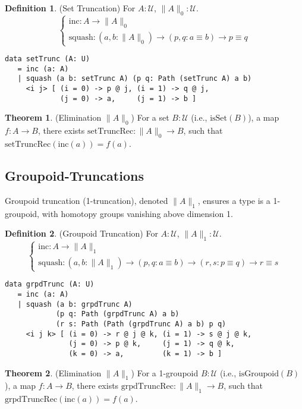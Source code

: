 \documentclass{article}
\theoremstyle{definition}
\newtheorem{theorem}{Theorem}
\newtheorem{definition}{Definition}
\begin{document}
\begin{definition} (Set Truncation)
For $A : \mathcal{U}$, $\| A \|_0 : \mathcal{U}$.
\[
\begin{cases}
\text{inc} : A \to \| A \|_0 \\
\text{squash} : (a, b : \| A \|_0) \to (p, q : a \equiv  b) \to p \equiv q
\end{cases}
\]
\begin{lstlisting}
data setTrunc (A: U)
   = inc (a: A)
   | squash (a b: setTrunc A) (p q: Path (setTrunc A) a b)
     <i j> [ (i = 0) -> p @ j, (i = 1) -> q @ j,
             (j = 0) -> a,     (j = 1) -> b ]
\end{lstlisting}
\end{definition}

\begin{theorem} (Elimination $\| A \|_0$)
For a set $B : \mathcal{U}$ (i.e., $\text{isSet}(B)$), a map $f : A \to B$,
there exists $\text{setTruncRec} : \| A \|_0 \to B$, such that $\text{setTruncRec}(\text{inc}(a)) = f(a)$.
\end{theorem}

\subsection{Groupoid-Truncations}
Groupoid truncation (1-truncation), denoted $\| A \|_1$, ensures a
type is a 1-groupoid, with homotopy groups vanishing above dimension 1.

\begin{definition} (Groupoid Truncation)
For $A : \mathcal{U}$, $\| A \|_1 : \mathcal{U}$.
\[
\begin{cases}
\text{inc} : A \to \| A \|_1 \\
\text{squash} : (a, b : \| A \|_1) \to (p, q : a \equiv b) \to (r, s : p \equiv  q) \to r \equiv s
\end{cases}
\]
\begin{lstlisting}
data grpdTrunc (A: U)
   = inc (a: A)
   | squash (a b: grpdTrunc A)
            (p q: Path (grpdTrunc A) a b)
            (r s: Path (Path (grpdTrunc A) a b) p q)
     <i j k> [ (i = 0) -> r @ j @ k, (i = 1) -> s @ j @ k,
               (j = 0) -> p @ k,     (j = 1) -> q @ k,
               (k = 0) -> a,         (k = 1) -> b ]
\end{lstlisting}
\end{definition}

\begin{theorem} (Elimination $\| A \|_1$)
For a 1-groupoid $B : \mathcal{U}$ (i.e., $\text{isGroupoid}(B)$),
a map $f : A \to B$, there exists $\text{grpdTruncRec} : \| A \|_1 \to B$,
such that $\text{grpdTruncRec}(\text{inc}(a)) = f(a)$.
\end{theorem}
\end{document}
